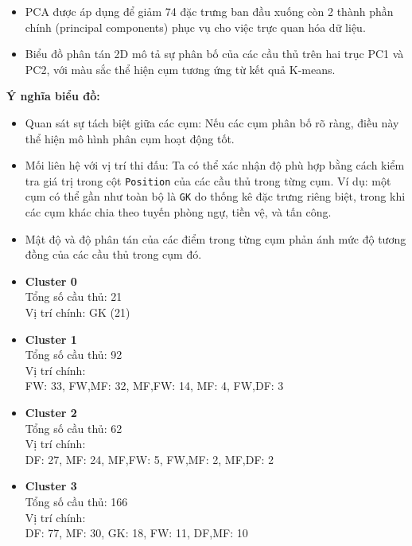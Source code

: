 \documentclass[12pt]{report}
\begin{document}
{
\begin{itemize}
  \item PCA được áp dụng để giảm 74 đặc trưng ban đầu xuống còn 2 thành phần chính (principal components) phục vụ cho việc trực quan hóa dữ liệu.
  \item Biểu đồ phân tán 2D mô tả sự phân bố của các cầu thủ trên hai trục PC1 và PC2, với màu sắc thể hiện cụm tương ứng từ kết quả K-means.
\end{itemize}

\textbf{Ý nghĩa biểu đồ:}
\begin{itemize}
  \item Quan sát sự tách biệt giữa các cụm: Nếu các cụm phân bố rõ ràng, điều này thể hiện mô hình phân cụm hoạt động tốt.
  \item Mối liên hệ với vị trí thi đấu: Ta có thể xác nhận độ phù hợp bằng cách kiểm tra giá trị trong cột \texttt{Position} của các cầu thủ trong từng cụm. Ví dụ: một cụm có thể gần như toàn bộ là \texttt{GK} do thống kê đặc trưng riêng biệt, trong khi các cụm khác chia theo tuyến phòng ngự, tiền vệ, và tấn công.
  \item Mật độ và độ phân tán của các điểm trong từng cụm phản ánh mức độ tương đồng của các cầu thủ trong cụm đó.
\end{itemize}


\begin{itemize}
  \item \textbf{Cluster 0} \\
  Tổng số cầu thủ: 21 \\
  Vị trí chính: GK (21)

  \item \textbf{Cluster 1} \\
  Tổng số cầu thủ: 92 \\
  Vị trí chính: \\
  \quad FW: 33, FW,MF: 32, MF,FW: 14, MF: 4, FW,DF: 3

  \item \textbf{Cluster 2} \\
  Tổng số cầu thủ: 62 \\
  Vị trí chính: \\
  \quad DF: 27, MF: 24, MF,FW: 5, FW,MF: 2, MF,DF: 2

  \item \textbf{Cluster 3} \\
  Tổng số cầu thủ: 166 \\
  Vị trí chính: \\
  \quad DF: 77, MF: 30, GK: 18, FW: 11, DF,MF: 10


\end{itemize}}
\end{document}
